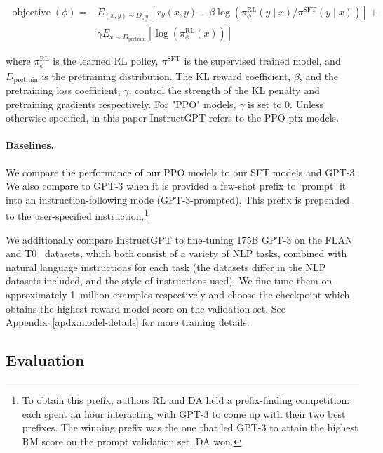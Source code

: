 \documentclass{article}
\begin{document}
\begin{equation} \label{eq2}
\begin{split}
\operatorname{objective}\left(\phi\right)= & E_{\left(x, y\right) \sim D_{\pi_{\phi}^{\mathrm{RL}}}}\left[r_{\theta}(x, y)-\beta \log \left(\pi_{\phi}^{\mathrm{RL}}(y \mid x) / \pi^{\mathrm{SFT}}(y \mid x)\right)\right] + \\
 & \gamma E_{x \sim D_\textrm{pretrain}}\left[\log(\pi_{\phi}^{\mathrm{RL}}(x))\right]
\end{split}
\end{equation}

where \( \pi_{\phi}^{\mathrm{RL}}\) is the learned RL policy, \( \pi^{\mathrm{SFT}}\) is the supervised trained model, and \(D_\textrm{pretrain} \) is the pretraining distribution. The KL reward coefficient, \( \beta \), and the pretraining loss coefficient, \( \gamma \), control the strength of the KL penalty and pretraining gradients respectively. For "PPO" models, \( \gamma \) is set to 0. Unless otherwise specified, in this paper InstructGPT refers to the PPO-ptx models.

\paragraph{Baselines.} We compare the performance of our PPO models to our SFT models and GPT-3. We also compare to GPT-3 when it is provided a few-shot prefix to ‘prompt' it into an instruction-following mode (GPT-3-prompted). This prefix is prepended to the user-specified instruction.\footnote{To obtain this prefix, authors RL and DA held a prefix-finding competition: each spent an hour interacting with GPT-3 to come up with their two best prefixes. The winning prefix was the one that led GPT-3 to attain the highest RM score on the prompt validation set. DA won.}

We additionally compare InstructGPT to fine-tuning 175B GPT-3 on the FLAN~\citep{wei2021finetuned} and T0~\citep{sanh2021multitask} datasets, which both consist of a variety of NLP tasks, combined with natural language instructions for each task (the datasets differ in the NLP datasets included, and the style of instructions used). 
We fine-tune them on approximately 1~million examples respectively and choose the checkpoint which obtains the highest reward model score on the validation set. See Appendix~\ref{apdx:model-details} for more training details.

\subsection{Evaluation}
\label{sec:evaluation}
\end{document}
